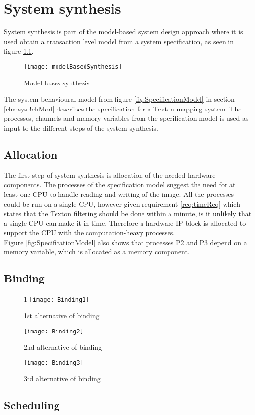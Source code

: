 \chapter{System synthesis}
System synthesis is part of the model-based system design approach where it is used obtain a transaction level model from a system specification, as seen in figure \ref{fig:modelBasedSyn}. 

\begin{figure}[H]
\centering
\texttt{[image: modelBasedSynthesis]}
\caption{Model bases synthesis}
\label{fig:modelBasedSyn}
\end{figure}

The system behavioural model from figure \ref{fig:SpecificationModel} in section \ref{cha:sysBehMod} describes the specification for a Texton mapping system. 
The processes, channels and memory variables from the specification model is used as input to the different steps of the system synthesis.  

\section{Allocation}
The first step of system synthesis is allocation of the needed hardware components. 
The processes of the specification model suggest the need for at least one CPU to handle reading and writing of the image. 
All the processes could be run on a single CPU, however given requirement \ref{req:timeReq} which states that the Texton filtering should be done within a minute, is it unlikely that a single CPU can make it in time. 
Therefore a hardware IP block is allocated to support the CPU with the computation-heavy processes.
\\Figure \ref{fig:SpecificationModel} also shows that processes P2 and P3 depend on a memory variable, which is allocated as a memory component. 

\section{Binding}

\begin{figure}[H]
1\centering
\texttt{[image: Binding1]}
\caption{1st alternative of binding}
\label{fig:Binding1}
\end{figure}

\begin{figure}[H]
\centering
\texttt{[image: Binding2]}
\caption{2nd alternative of binding}
\label{fig:Binding2}
\end{figure}

\begin{figure}[H]
\centering
\texttt{[image: Binding3]}
\caption{3rd alternative of binding}
\label{fig:Binding3}
\end{figure}


\section{Scheduling}